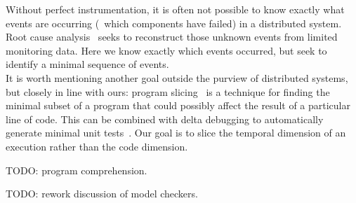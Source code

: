 %
 Without perfect instrumentation,
it is often not possible to know exactly what events are occurring (\eg~which
components have failed) in a
distributed system. Root cause analysis~\cite{yemini1996,Kandula:2009:DDE:1592568.1592597}
seeks to reconstruct those unknown events from limited monitoring data.
Here we know exactly which events occurred, but
seek to identify a minimal sequence of events.\\[0.5ex]
%
It is worth mentioning another goal outside the purview of distributed systems, but
closely in line with ours: program slicing~\cite{weiser1981program} is a
technique for finding the
minimal subset of a program that could possibly affect the result of a particular line of code.
This can be combined with delta debugging to automatically generate minimal unit tests~\cite{burger2011minimizing}.
Our goal is to slice the temporal dimension of an execution rather than the
code dimension.

TODO: program comprehension.

TODO: rework discussion of model checkers.
